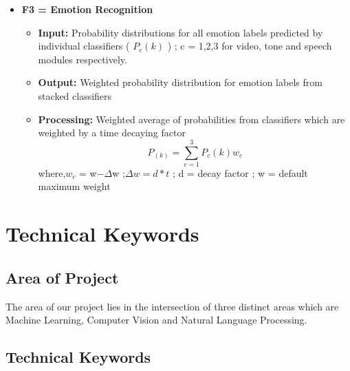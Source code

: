 \documentclass[oneside,a4paper,12pt]{report}
\begin{document}
\begin{normalsize}
\begin{itemize}
\begin{itemize}
\vspace{4mm}
	\item \textbf{F3 = Emotion Recognition}\\
	\begin{itemize}
		\item \textbf{Input: } Probability distributions for all emotion labels predicted by individual classifiers ( \( P_c(k) \) ) ; c = 1,2,3 for video, tone and speech modules respectively.
		\newline
		\item \textbf{Output: } Weighted probability distribution for emotion labels from stacked classifiers
		\newline
		\item \textbf{Processing: } Weighted average of probabilities from classifiers which are weighted by a time decaying factor
		\begin{equation}
		P_{(k)} = \sum_{c=1}^{3} P_c(k) w_c
		\end{equation}
		where,\newline \(w_c\) = w\( - \Delta\)w ;\newline \(\Delta w = d * t\) ; \newline d = decay factor ; \newline w = default maximum weight
	\end{itemize}
\end{itemize}
\end{itemize}
\newpage


\chapter{Technical Keywords}

\section{Area of Project}
\begin{center}
	The area of our project lies in the intersection of three distinct areas which are Machine Learning, Computer Vision and Natural Language Processing.
\end{center}

\section{Technical Keywords}


\end{normalsize}
\end{document}
